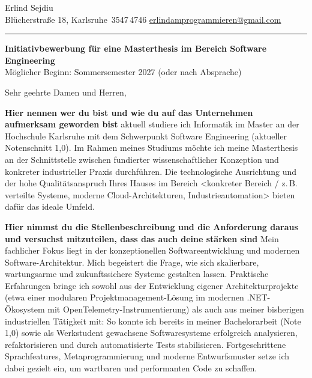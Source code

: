 \documentclass[a4paper,11pt]{article}
\begin{document}
{\LARGE Erlind Sejdiu}\\[0.3em]
{\small\color{muted}
Blücherstraße 18, Karlsruhe \enspace\textbar{}\,3547\,4746 \enspace\textbar\enspace
\href{mailto:erlindamprogrammieren@gmail.com}{erlindamprogrammieren@gmail.com}}\\[0.4em]
\textcolor{hairline}{\rule{\linewidth}{0.7pt}}

\vspace{0.8em}

\vspace{1.1em}

{\large\textbf{Initiativbewerbung für eine Masterthesis im Bereich Software Engineering}}\\[0.15em]
{\small\color{muted}Möglicher Beginn: Sommersemester 2027 (oder nach Absprache)}

\vspace{0.5em}

Sehr geehrte Damen und Herren,%

\textbf{Hier nennen wer du bist und wie du auf das Unternehmen aufmerksam geworden bist}
aktuell studiere ich Informatik im Master an der Hochschule Karlsruhe mit dem Schwerpunkt Software Engineering (aktueller Notenschnitt 1,0). Im Rahmen meines Studiums möchte ich meine Masterthesis an der Schnittstelle zwischen fundierter wissenschaftlicher Konzeption und konkreter industrieller Praxis durchführen. Die technologische Ausrichtung und der hohe Qualitätsanspruch Ihres Hauses im Bereich <konkreter Bereich / z.\,B. verteilte Systeme, moderne Cloud-Architekturen, Industrieautomation> bieten dafür das ideale Umfeld.

\textbf{Hier nimmst du die Stellenbeschreibung und die Anforderung daraus und versuchst mitzuteilen, dass das auch deine stärken sind}
Mein fachlicher Fokus liegt in der konzeptionellen Softwareentwicklung und modernen Software-Architektur. Mich begeistert die Frage, wie sich skalierbare, wartungsarme und zukunftssichere Systeme gestalten lassen. Praktische Erfahrungen bringe ich sowohl aus der Entwicklung eigener Architekturprojekte (etwa einer modularen Projektmanagement-Lösung im modernen .NET-Ökosystem mit OpenTelemetry-Instrumentierung) als auch aus meiner bisherigen industriellen Tätigkeit mit: So konnte ich bereits in meiner Bachelorarbeit (Note 1,0) sowie als Werkstudent gewachsene Softwaresysteme erfolgreich analysieren, refaktorisieren und durch automatisierte Tests stabilisieren. Fortgeschrittene Sprachfeatures, Metaprogrammierung und moderne Entwurfsmuster setze ich dabei gezielt ein, um wartbaren und performanten Code zu schaffen.
\end{document}

